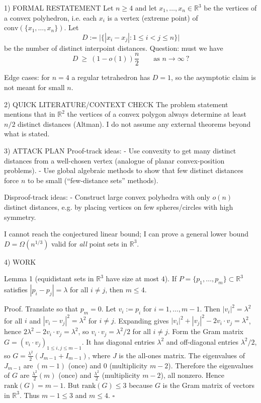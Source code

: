 1) FORMAL RESTATEMENT
Let $n\ge 4$ and let $x_1,\ldots,x_n\in\mathbb{R}^3$ be the vertices of a convex polyhedron,
i.e. each $x_i$ is a vertex (extreme point) of $\mathrm{conv}(\{x_1,\ldots,x_n\})$.
Let
\[
D:=\bigl|\bigl\{|x_i-x_j|:1\le i<j\le n\bigr\}\bigr|
\]
be the number of distinct interpoint distances. Question: must we have
\[
D\ \ge\ (1-o(1))\frac{n}{2}\qquad\text{as }n\to\infty\ ?
\]

Edge cases: for $n=4$ a regular tetrahedron has $D=1$, so the asymptotic claim is not meant for small $n$.

2) QUICK LITERATURE/CONTEXT CHECK
The problem statement mentions that in $\mathbb{R}^2$ the vertices of a convex polygon always determine
at least $n/2$ distinct distances (Altman). I do not assume any external theorems beyond what is stated.

3) ATTACK PLAN
Proof-track ideas:
- Use convexity to get many distinct distances from a well-chosen vertex (analogue of planar convex-position problems).
- Use global algebraic methods to show that few distinct distances force $n$ to be small (``few-distance sets'' methods).

Disproof-track ideas:
- Construct large convex polyhedra with only $o(n)$ distinct distances, e.g. by placing vertices on few spheres/circles with high symmetry.

I cannot reach the conjectured linear bound; I can prove a general lower bound $D=\Omega(n^{1/3})$ valid for \emph{all} point sets in $\mathbb{R}^3$.

4) WORK

Lemma 1 (equidistant sets in $\mathbb{R}^3$ have size at most $4$).
If $P=\{p_1,\ldots,p_m\}\subset\mathbb{R}^3$ satisfies $|p_i-p_j|=\lambda$ for all $i\neq j$, then $m\le 4$.

Proof.
Translate so that $p_m=0$. Let $v_i:=p_i$ for $i=1,\ldots,m-1$. Then
$|v_i|^2=\lambda^2$ for all $i$ and $|v_i-v_j|^2=\lambda^2$ for $i\neq j$. Expanding gives
$|v_i|^2+|v_j|^2-2v_i\cdot v_j=\lambda^2$, hence $2\lambda^2-2v_i\cdot v_j=\lambda^2$, so
$v_i\cdot v_j=\lambda^2/2$ for all $i\neq j$.
Form the Gram matrix $G=(v_i\cdot v_j)_{1\le i,j\le m-1}$. It has diagonal entries $\lambda^2$ and off-diagonal entries $\lambda^2/2$, so
$G=\frac{\lambda^2}{2}(J_{m-1}+I_{m-1})$, where $J$ is the all-ones matrix. The eigenvalues of $J_{m-1}$ are $(m-1)$ (once) and $0$ (multiplicity $m-2$).
Therefore the eigenvalues of $G$ are $\frac{\lambda^2}{2}(m)$ (once) and $\frac{\lambda^2}{2}$ (multiplicity $m-2$), all nonzero. Hence $\mathrm{rank}(G)=m-1$.
But $\mathrm{rank}(G)\le 3$ because $G$ is the Gram matrix of vectors in $\mathbb{R}^3$. Thus $m-1\le 3$ and $m\le 4$. $\square$

